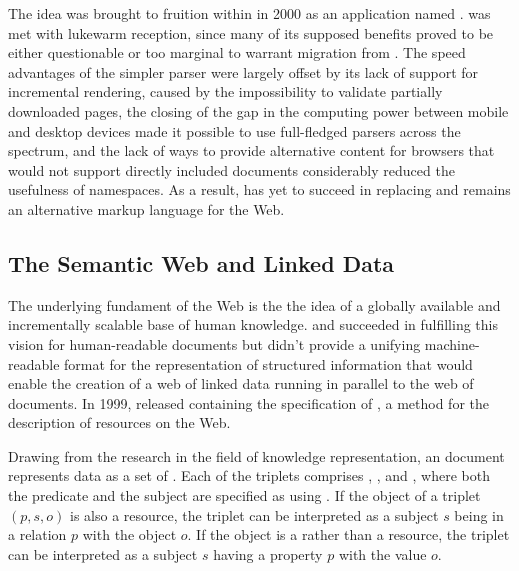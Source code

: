 \documentclass{book}
\begin{document}
The idea was brought to fruition within \cite{pemberton00} in 2000 as an
 application named .  was met with
lukewarm reception, since many of its supposed benefits proved to be either
questionable or too marginal to warrant migration from . The
speed advantages of the simpler parser were largely offset by its lack of
support for incremental rendering, caused by the impossibility to validate
partially downloaded pages, the closing of the gap in the computing power
between mobile and desktop devices made it possible to use full-fledged
 parsers across the spectrum, and the lack of ways to provide
alternative content for browsers that would not support directly included
 documents considerably reduced the usefulness of 
namespaces. As a result,  has yet to succeed in replacing
 and remains an alternative markup language for the Web.


\subsection{The Semantic Web and Linked Data}
The underlying fundament of the Web is the the idea of a globally available and
incrementally scalable base of human knowledge.  and
 succeeded in fulfilling this vision for human-readable documents
but didn't provide a unifying machine-readable format for the representation of
structured information that would enable the creation of a web of linked data
running in parallel to the web of documents. In 1999,  released
\cite{lassira99} containing the specification of , a method for the
description of resources on the Web.

Drawing from the research in the field of knowledge representation, an
 document represents data as a set of 
. Each of the triplets comprises , , and ,
where both the predicate and the subject are specified as 
 using . If the object of a triplet
$(p,s,o)$ is also a resource, the triplet can be interpreted as a subject $s$
being in a relation $p$ with the object $o$. If the object is a   rather than a resource, the triplet can be
interpreted as a subject $s$ having a property $p$ with the value $o$.
\end{document}

